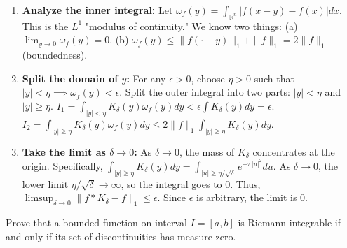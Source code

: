\begin{solution}
\begin{enumerate}
    \item \textbf{Analyze the inner integral:}
    Let $\omega_f(y) = \int_{\mathbb{R}^n} |f(x-y) - f(x)| dx$. This is the $L^1$ "modulus of continuity."
    We know two things:
    (a) $\lim_{y \to 0} \omega_f(y) = 0$.
    (b) $\omega_f(y) \leq \|f(\cdot-y)\|_1 + \|f\|_1 = 2\|f\|_1$ (boundedness).

    \item \textbf{Split the domain of $y$:}
    For any $\epsilon > 0$, choose $\eta > 0$ such that $|y| < \eta \implies \omega_f(y) < \epsilon$.
    Split the outer integral into two parts: $|y| < \eta$ and $|y| \geq \eta$.
    $I_1 = \int_{|y|<\eta} K_\delta(y) \omega_f(y) dy < \epsilon \int K_\delta(y) dy = \epsilon$.
    $I_2 = \int_{|y|\geq \eta} K_\delta(y) \omega_f(y) dy \leq 2\|f\|_1 \int_{|y|\geq \eta} K_\delta(y) dy$.

    \item \textbf{Take the limit as $\delta \to 0$:}
    As $\delta \to 0$, the mass of $K_\delta$ concentrates at the origin.
    Specifically, $\int_{|y|\geq \eta} K_\delta(y) dy = \int_{|u| \geq \eta/\sqrt{\delta}} e^{-\pi |u|^2} du$.
    As $\delta \to 0$, the lower limit $\eta/\sqrt{\delta} \to \infty$, so the integral goes to 0.
    Thus, $\limsup_{\delta \to 0} \|f * K_\delta - f\|_1 \leq \epsilon$. Since $\epsilon$ is arbitrary, the limit is 0.
\end{enumerate}
\end{solution}

\begin{exercise}
\label{analysis:2016:3}
Prove that a bounded function on interval $I=[a,b]$ is Riemann integrable if and only if its set of discontinuities has measure zero.
\end{exercise}

